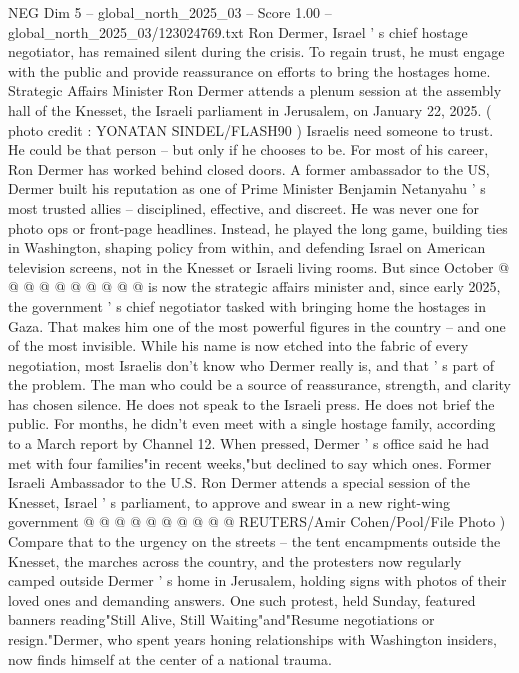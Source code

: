 \begin{textsample}{NEG Dim 5 – global\_north\_2025\_03 – Score 1.00 – global\_north\_2025\_03/123024769.txt}  \label{ex:f5_neg_300}
Ron Dermer, Israel ' s chief hostage negotiator, has remained silent during the crisis.
To regain trust, he must engage with the public and provide reassurance on efforts to bring the hostages home.
Strategic Affairs Minister Ron Dermer attends a plenum session at the assembly hall of the Knesset, the Israeli parliament in Jerusalem, on January 22, 2025. ( photo credit : YONATAN SINDEL/FLASH90 ) Israelis need someone to trust.
He could be that person -- but only if he chooses to be.
For most of his career, Ron Dermer has worked behind closed doors.
A former ambassador to the US, Dermer built his reputation as one of Prime Minister Benjamin Netanyahu ' s most trusted allies -- disciplined, effective, and discreet.
He was never one for photo ops or front-page headlines.
Instead, he played the long game, building ties in Washington, shaping policy from within, and defending Israel on American television screens, not in the Knesset or Israeli living rooms.
But since October @ @ @ @ @ @ @ @ @ @ is now the strategic affairs minister and, since early 2025, the government ' s chief negotiator tasked with bringing home the hostages in Gaza.
That makes him one of the most powerful figures in the country -- and one of the most invisible.
While his name is now etched into the fabric of every negotiation, most Israelis don't know who Dermer really is, and that ' s part of the problem.
The man who could be a source of reassurance, strength, and clarity has chosen silence.
He does not speak to the Israeli press.
He does not brief the public.
For months, he didn't even meet with a single hostage family, according to a March report by Channel 12.
When pressed, Dermer ' s office said he had met with four families"in recent weeks,"but declined to say which ones.
Former Israeli Ambassador to the U.S.
Ron Dermer attends a special session of the Knesset, Israel ' s parliament, to approve and swear in a new right-wing government @ @ @ @ @ @ @ @ @ @ REUTERS/Amir Cohen/Pool/File Photo ) Compare that to the urgency on the streets -- the tent encampments outside the Knesset, the marches across the country, and the protesters now regularly camped outside Dermer ' s home in Jerusalem, holding signs with photos of their loved ones and demanding answers.
One such protest, held Sunday, featured banners reading"Still Alive, Still Waiting"and"Resume negotiations or resign."Dermer, who spent years honing relationships with Washington insiders, now finds himself at the center of a national trauma.

\end{textsample}
